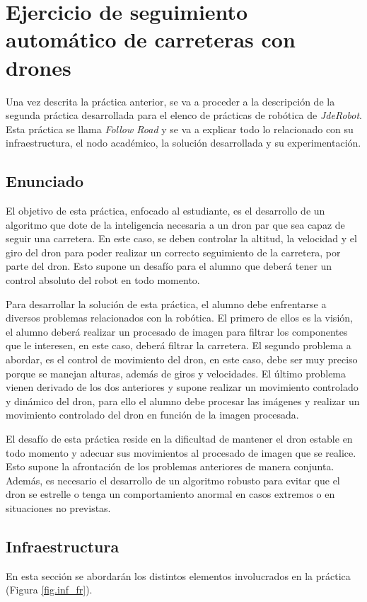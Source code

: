 \chapter{Ejercicio de seguimiento automático de carreteras con drones}\label{cap.followroad}
Una vez descrita la práctica anterior, se va a proceder a la descripción de la segunda práctica desarrollada para el elenco de prácticas de robótica de \textit{JdeRobot}. Esta práctica se llama \textit{Follow Road} y se va a explicar todo lo relacionado con su infraestructura, el nodo académico, la solución desarrollada y su experimentación.

\section{Enunciado}\label{sec.enunciado}
El objetivo de esta práctica, enfocado al estudiante, es el desarrollo de un algoritmo que dote de la inteligencia necesaria a un dron par que sea capaz de seguir una carretera. En este caso, se deben controlar la altitud, la velocidad y el giro del dron para poder realizar un correcto seguimiento de la carretera, por parte del dron. Esto supone un desafío para el alumno que deberá tener un control absoluto del robot en todo momento.

Para desarrollar la solución de esta práctica, el alumno debe enfrentarse a diversos problemas relacionados con la robótica. El primero de ellos es la visión, el alumno deberá realizar un procesado de imagen para filtrar los componentes que le interesen, en este caso, deberá filtrar la carretera. El segundo problema a abordar, es el control de movimiento del dron, en este caso, debe ser muy preciso porque se manejan alturas, además de giros y velocidades. El último problema vienen derivado de los dos anteriores y supone realizar un movimiento controlado y dinámico del dron, para ello el alumno debe procesar las imágenes y realizar un movimiento controlado del dron en función de la imagen procesada.

El desafío de esta práctica reside en la dificultad de mantener el dron estable en todo momento y adecuar sus movimientos al procesado de imagen que se realice. Esto supone la afrontación de los problemas anteriores de manera conjunta. Además, es necesario el desarrollo de un algoritmo robusto para evitar que el dron se estrelle o tenga un comportamiento anormal en casos extremos o en situaciones no previstas.

\section{Infraestructura}
En esta sección se abordarán los distintos elementos involucrados en la práctica (Figura \ref{fig.inf_fr}).

